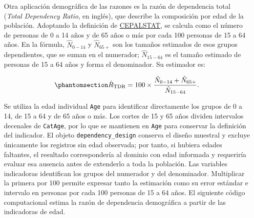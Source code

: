 \documentclass[
  spanish,
  11pt,
  letterpaper,
  oneside,
  open=any]{scrbook}
\begin{document}
Otra aplicación demográfica de las razones es la razón de dependencia
total (\emph{Total Dependency Ratio}, en inglés), que describe la
composición por edad de la población. Adoptando la definición de
\href{https://statistics.cepal.org/portal/cepalstat/technical-sheet.html?indicator_id=35&lang=es}{CEPALSTAT},
se calcula como el número de personas de 0 a 14 años y de 65 años o más
por cada 100 personas de 15 a 64 años. En la fórmula, \(\hat N_{0-14}\)
y \(\hat N_{65+}\) son los tamaños estimados de esos grupos
dependientes, que se suman en el numerador; \(\hat N_{15-64}\) es el
tamaño estimado de personas de 15 a 64 años y forma el denominador. Su
estimador es:

\begin{equation}\protect\phantomsection\label{eq-dependencia-demografica}{
\hat R_{\mathrm{TDR}} = 100\times\frac{\hat N_{0-14}+\hat N_{65+}}{\hat N_{15-64}}.
}\end{equation}

Se utiliza la edad individual \texttt{Age} para identificar directamente
los grupos de 0 a 14, de 15 a 64 y de 65 años o más. Los cortes de 15 y
65 años dividen intervalos decenales de \texttt{CatAge}, por lo que se
mantienen en \texttt{Age} para conservar la definición del indicador. El
objeto \texttt{dependency\_design} conserva el diseño muestral y excluye
únicamente los registros sin edad observada; por tanto, si hubiera
edades faltantes, el resultado correspondería al dominio con edad
informada y requeriría evaluar esa ausencia antes de extenderlo a toda
la población. Las variables indicadoras identifican los grupos del
numerador y del denominador. Multiplicar la primera por 100 permite
expresar tanto la estimación como su error estándar e intervalo en
personas por cada 100 personas de 15 a 64 años. El siguiente código
computacional estima la razón de dependencia demográfica a partir de las
indicadoras de edad.
\end{document}

